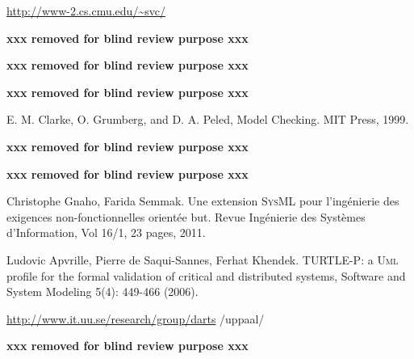 \documentclass[a4paper,twoside]{article}
\def\myrelax{\textsc{Relax}}                  %
\def\sysml{\textsc{SysML}}
\def\UML{\textsc{Uml}}
\def\uml{\textsc{Uml}}
\newcommand{\final}[1]{\textbf{xxx removed for blind review purpose xxx}}
\begin{document}
\begin{thebibliography}{1}

\url{http://www-2.cs.cmu.edu/~svc/}

\final{Dragomir, I. A Case Study in Formal System Engineering with SysML, 17th International Conference on Engineering of Complex Computer Systems (ICECCS), 2012,Pages: 189 - 198.}

 \final{Iulian Ober and Iulia Dragomir. OMEGA2: A new version of the profile and the tools, 15th IEEE International Conference on Engineering of Complex Computer Systems, DOI 10.1109/ICECCS.2010.59.}

  \final{Iulian Ober, Susanne Graf and Ileana Ober. Validating timed \uml{} models by simulation and verification, International Journal on Software Tools for Technology (2006) 8(2): 128–145 DOI 10.1007/s10009-005-0205-x.}

E. M. Clarke, O. Grumberg, and D. A. Peled, Model Checking. MIT Press, 1999.

 \final{Jon Whittle, Pete Sawyer, Nelly Bencomo, Betty H.C. Cheng, and Jean-Michel Bruel. \myrelax{} : Incorporating Uncertainty into the Speciﬁcation of Self-Adaptive systems, Proceedings of the 17th IEEE International RE Conference, Pages: 79-88.}

 \final{Manzoor Ahmad, Jean Michel Bruel, R\'egine Laleau and Christophe Gnaho. Using RELAX, SysML and KAOS for Ambient Systems Requirements Modeling, Procedia Computer Science Volume 10, 2012, Pages 474–481.}

 Christophe Gnaho, Farida Semmak. Une extension \sysml{} pour l'ing\'enierie des exigences non-fonctionnelles orient\'ee but. Revue Ing\'enierie des Syst\`emes d'Information, Vol 16/1, 23 pages, 2011.

 Ludovic Apvrille, Pierre de Saqui-Sannes, Ferhat Khendek. TURTLE-P: a \UML{} profile for the formal validation of critical and distributed systems, Software and System Modeling 5(4): 449-466 (2006).

 \url{http://www.it.uu.se/research/group/darts}
/uppaal/

\final{I.~Ober and I.~Dragomir, ``{Unambiguous \UML{} Composite Structures: The OMEGA2 Experience},'' in   \emph{SOFSEM 2011: Theory and Practice of Computer Science}, ser. Lecture Notes in Computer Science, I.~Cerna, T.~Gyimothy, J.~Hromkovic, K.~Jefferey, R.~Kralovic, M.~Vukolic, and S.~Wolf, Eds.\hskip 1em plus 0.5em minus 0.4em\relax Springer Berlin / Heidelberg, 2011, vol. 6543, pp. 418--430.}



\end{thebibliography}
\end{document}
